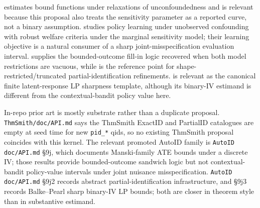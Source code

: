 \documentclass[11pt]{article}
\theoremstyle{definition}
\theoremstyle{plain}
\theoremstyle{remark}
\begin{document}
\citet{MastenPoirierZhang2024} estimates bound functions under relaxations of unconfoundedness and is relevant because this proposal also treats the sensitivity parameter as a reported curve, not a binary assumption. \citet{JinXuZhengZhou2025} studies policy learning under unobserved confounding with robust welfare criteria under the marginal sensitivity model; their learning objective is a natural consumer of a sharp joint-misspecification evaluation interval. \citet{Manski1990} supplies the bounded-outcome fill-in logic recovered when both model restrictions are vacuous, while \citet{ManskiPepper2000} is the reference point for shape-restricted/truncated partial-identification refinements. \citet{BalkePearl1997} is relevant as the canonical finite latent-response LP sharpness template, although its binary-IV estimand is different from the contextual-bandit policy value here.

In-repo prior art is mostly substrate rather than a duplicate proposal. \texttt{ThmSmith/doc/API.md} says the ThmSmith ExactID and PartialID catalogues are empty at seed time for new \texttt{pid\_*} qids, so no existing ThmSmith proposal coincides with this kernel. The relevant promoted AutoID family is \texttt{AutoID} \texttt{doc/API.md} \S9j, which documents Manski-family ATE bounds under a discrete IV; those results provide bounded-outcome sandwich logic but not contextual-bandit policy-value intervals under joint nuisance misspecification. \texttt{AutoID} \texttt{doc/API.md} \S9j2 records abstract partial-identification infrastructure, and \S9j3 records Balke--Pearl sharp binary-IV LP bounds; both are closer in theorem style than in substantive estimand.
\end{document}
